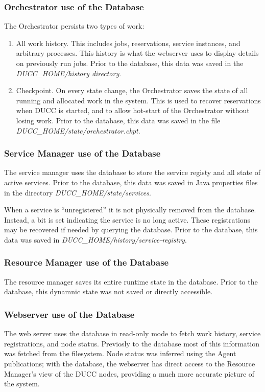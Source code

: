     \subsubsection{Orchestrator use of the Database}

    The Orchestrator persists two types of work:
    \begin{enumerate}
      \item All work history.  This includes jobs, reservations, service instances, and 
        arbitrary processes.  This history is what the webserver uses to display details
        on previously run jobs.  Prior to the database, this data was saved in the
        {\em DUCC\_HOME/history directory}.
      \item Checkpoint.  On every state change, the Orchestrator saves the state of 
        all running and allocated work in the system.  This is used to recover reservations
        when DUCC is started, and to allow hot-start of the Orchestrator without losing work.
        Prior to the database, this data was saved in the file {\em DUCC\_HOME/state/orchestrator.ckpt}.
    \end{enumerate}
    
    \subsubsection{Service Manager use of the Database}
    The service manager uses the database to store the service registy and all state
    of active services.  Prior to the database, this data was saved in Java properties files
    in the directory {\em DUCC\_HOME/state/services}.

    When a service is ``unregistered'' it is not physically removed from the database.  Instead,
    a bit is set indicating the service is no long active.  These registrations may be
    recovered if needed by querying the database.  Prior to the database, this data was saved
    in {\em DUCC\_HOME/history/service-registry}.

    \subsubsection{Resource Manager use of the Database}
    The resource manager saves its entire runtime state in the database.  Prior to the
    database, this dynamnic state was not saved or directly accessible.

    \subsubsection{Webserver use of the Database}
    The web server uses the database in read-only mode to fetch work history, service
    registrations, and node status.  Previosly to the database most of this information
    was fetched from the filesystem.  Node status was inferred using the Agent publications;
    with the database, the webserver has direct access to the Resource Manager's view of the
    DUCC nodes, providing a much more accurate picture of the system.
  
